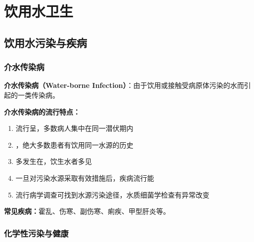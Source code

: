 \documentclass[10pt,a4paper,oneside]{ctexbook}
\begin{document}
\newpage

\chapter{饮用水卫生}
\setcounter{chapter}{6}

\section{饮用水污染与疾病}

\subsection{介水传染病}

\begin{defbox}
\textbf{介水传染病（Water-borne Infection）}：由于饮用或接触受病原体污染的水而引起的一类传染病。
\end{defbox}

\begin{keybox}
\textbf{介水传染病的流行特点：}
\begin{enumerate}[leftmargin=*]
    \item 流行呈，多数病人集中在同一潜伏期内
    \item {}，绝大多数患者有饮用同一水源的历史
    \item 多发生在，饮生水者多见
    \item 一旦对污染水源采取有效措施后，疾病流行能
    \item 流行病学调查可找到水源污染途径，水质细菌学检查有异常改变
\end{enumerate}
\textbf{常见疾病：}霍乱、伤寒、副伤寒、痢疾、甲型肝炎等。
\end{keybox}

\subsection{化学性污染与健康}
\end{document}
